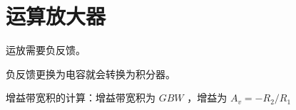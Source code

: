 \documentclass[cn,11pt,chinese,black,simple]{../elegantbook}
\begin{document}
\fi 
\def\chapname{05oa}

\chapter{运算放大器}

运放需要负反馈。

负反馈更换为电容就会转换为积分器。

增益带宽积的计算：增益带宽积为 \(GBW\) ，增益为 \(A_v = - R_2/R_1\) 

\let\chapname\undefined
\ifx\mainclass\undefined
\end{document}
